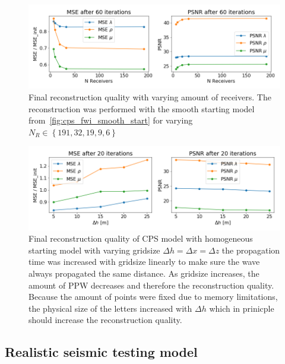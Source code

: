 \documentclass[10pt]{SelfArx} %
\theoremstyle{definition}
\begin{document}
\begin{figure}[!h]\label{fig:cps_n_receiver_comparison}
\hspace*{-0.4in}
\includegraphics[width=1.15\textwidth]{fig/fwi_vs_n_receivers.png}
\caption{Final reconstruction quality with varying amount of receivers. The reconstruction was performed with the smooth starting model from~\cref{fig:cps_fwi_smooth_start} for varying $N_R \in \left\{191,32,19,9,6\right\}$}
\end{figure}

\begin{figure}[!h]\label{fig:cps_gridsize_comparison}
\hspace*{-0.4in}
\includegraphics[width=1.15\textwidth]{fig/fwi_vs_gridsize.png}
\caption{Final reconstruction quality of CPS model with homogeneous starting model with varying gridsize $\Delta h = \Delta x = \Delta z$ the propagation time was increased with gridsize linearly to make sure the wave always propagated the same distance. As gridsize increases, the amount of PPW decreases and therefore the reconstruction quality. Because the amount of points were fixed due to memory limitations, the physical size of the letters increased with $\Delta h$ which in prinicple should increase the reconstruction quality.}
\end{figure}
\clearpage
\subsection{Realistic seismic testing model}
\end{document}
